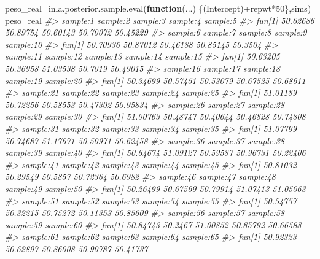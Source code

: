 \documentclass[
]{book}
\newenvironment{Shaded}{\begin{snugshade}}{\end{snugshade}}
\newcommand{\CommentTok}[1]{\textcolor[rgb]{0.56,0.35,0.01}{\textit{#1}}}
\newcommand{\ControlFlowTok}[1]{\textcolor[rgb]{0.13,0.29,0.53}{\textbf{#1}}}
\newcommand{\DecValTok}[1]{\textcolor[rgb]{0.00,0.00,0.81}{#1}}
\newcommand{\FunctionTok}[1]{\textcolor[rgb]{0.00,0.00,0.00}{#1}}
\newcommand{\NormalTok}[1]{#1}
\newcommand{\OtherTok}[1]{\textcolor[rgb]{0.56,0.35,0.01}{#1}}
\newcommand{\SpecialCharTok}[1]{\textcolor[rgb]{0.00,0.00,0.00}{#1}}
\begin{document}
\begin{Shaded}
\begin{Highlighting}[]
\NormalTok{peso\_real}\OtherTok{=}\FunctionTok{inla.posterior.sample.eval}\NormalTok{(}\ControlFlowTok{function}\NormalTok{(...) \{(Intercept)}\SpecialCharTok{+}\NormalTok{repwt}\SpecialCharTok{*}\DecValTok{50}\NormalTok{\},sims)}
\NormalTok{peso\_real}
\CommentTok{\#\textgreater{}        sample:1 sample:2 sample:3 sample:4 sample:5}
\CommentTok{\#\textgreater{} fun[1] 50.62686 50.89754 50.60143 50.70072 50.45229}
\CommentTok{\#\textgreater{}        sample:6 sample:7 sample:8 sample:9 sample:10}
\CommentTok{\#\textgreater{} fun[1] 50.70936 50.87012 50.46188 50.85145   50.3504}
\CommentTok{\#\textgreater{}        sample:11 sample:12 sample:13 sample:14 sample:15}
\CommentTok{\#\textgreater{} fun[1]  50.63205  50.36958  51.03538   50.7019  50.49015}
\CommentTok{\#\textgreater{}        sample:16 sample:17 sample:18 sample:19 sample:20}
\CommentTok{\#\textgreater{} fun[1]  50.34699  50.57451  50.53079  50.67525  50.68611}
\CommentTok{\#\textgreater{}        sample:21 sample:22 sample:23 sample:24 sample:25}
\CommentTok{\#\textgreater{} fun[1]  51.01189  50.72256  50.58553  50.47302  50.95834}
\CommentTok{\#\textgreater{}        sample:26 sample:27 sample:28 sample:29 sample:30}
\CommentTok{\#\textgreater{} fun[1]  51.00763  50.48747  50.40644  50.46828  50.74808}
\CommentTok{\#\textgreater{}        sample:31 sample:32 sample:33 sample:34 sample:35}
\CommentTok{\#\textgreater{} fun[1]  51.07799  50.74687  51.17671  50.50971  50.62458}
\CommentTok{\#\textgreater{}        sample:36 sample:37 sample:38 sample:39 sample:40}
\CommentTok{\#\textgreater{} fun[1]  50.64674  51.09127  50.59587  50.96731  50.22406}
\CommentTok{\#\textgreater{}        sample:41 sample:42 sample:43 sample:44 sample:45}
\CommentTok{\#\textgreater{} fun[1]  50.81032  50.29549   50.5857  50.72364   50.6982}
\CommentTok{\#\textgreater{}        sample:46 sample:47 sample:48 sample:49 sample:50}
\CommentTok{\#\textgreater{} fun[1]  50.26499  50.67569  50.79914  51.07413  51.05063}
\CommentTok{\#\textgreater{}        sample:51 sample:52 sample:53 sample:54 sample:55}
\CommentTok{\#\textgreater{} fun[1]  50.54757  50.32215  50.75272  50.11353  50.85609}
\CommentTok{\#\textgreater{}        sample:56 sample:57 sample:58 sample:59 sample:60}
\CommentTok{\#\textgreater{} fun[1]  50.84743   50.2467  51.00852  50.85792  50.66588}
\CommentTok{\#\textgreater{}        sample:61 sample:62 sample:63 sample:64 sample:65}
\CommentTok{\#\textgreater{} fun[1]  50.92323  50.62897  50.86008  50.90787  50.41737}

\end{Highlighting}
\end{Shaded}
\end{document}
